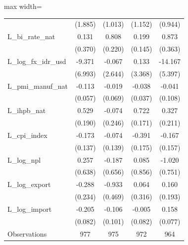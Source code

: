 \begin{table}[H]
\begin{adjustbox}{max width=\textwidth}
\begin{tabular}{l*{4}{c}}
            &     (1.885)         &     (1.013)         &     (1.152)         &     (0.944)         \\
L\_bi\_rate\_nat&       0.131         &       0.808\sym{***}&       0.199         &       0.873\sym{*}  \\
            &     (0.370)         &     (0.220)         &     (0.145)         &     (0.363)         \\
L\_log\_fx\_idr\_usd&      -9.371         &      -0.067         &       0.133         &     -14.167\sym{**} \\
            &     (6.993)         &     (2.644)         &     (3.368)         &     (5.397)         \\
L\_pmi\_manuf\_nat&      -0.113\sym{*}  &      -0.019         &      -0.038         &      -0.041         \\
            &     (0.057)         &     (0.069)         &     (0.037)         &     (0.108)         \\
L\_ihpb\_nat  &       0.529\sym{**} &      -0.074         &       0.722\sym{***}&       0.327         \\
            &     (0.190)         &     (0.246)         &     (0.171)         &     (0.211)         \\
L\_cpi\_index &      -0.173         &      -0.074         &      -0.391\sym{*}  &      -0.167         \\
            &     (0.137)         &     (0.139)         &     (0.175)         &     (0.157)         \\
L\_log\_npl   &       0.257         &      -0.187         &       0.085         &      -1.020         \\
            &     (0.638)         &     (0.656)         &     (0.856)         &     (0.751)         \\
L\_log\_export&      -0.288         &      -0.933\sym{*}  &       0.064         &       0.160         \\
            &     (0.234)         &     (0.469)         &     (0.316)         &     (0.193)         \\
L\_log\_import&      -0.205\sym{*}  &      -0.106         &      -0.005         &       0.158\sym{*}  \\
            &     (0.082)         &     (0.101)         &     (0.082)         &     (0.077)         \\
\midrule
Observations&         977         &         975         &         972         &         964         \\

\end{tabular}
\end{adjustbox}
\end{table}

